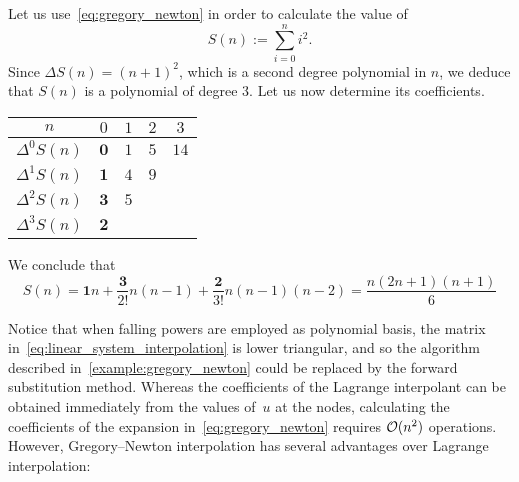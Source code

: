 \begin{example}
    \label{example:gregory_newton}
    Let us use~\eqref{eq:gregory_newton} in order to calculate the value of
    \[
        S(n) := \sum_{i=0}^{n} i^2.
    \]
    Since $\Delta S(n) = (n+1)^2$,
    which is a second degree polynomial in $n$,
    we deduce that $S(n)$ is a polynomial of degree 3.
    Let us now determine its coefficients.
    \begin{center}
    \begin{tabular}{|c|c|c|c|c|}
        \hline
        $n$    & $0$ & $1$ & $2$ & $3$ \\ \hline
        $\Delta^0 S(n)$ & $\mathbf{0}$ & $1$ & $5$ & $14$ \\ \hline
        $\Delta^1 S(n)$ & $\mathbf{1}$ & $4$ & $9$ &  \\ \hline
        $\Delta^2 S(n)$ & $\mathbf{3}$ & $5$ & & \\ \hline
        $\Delta^3 S(n)$ & $\mathbf{2}$ & & & \\ \hline
    \end{tabular}
    \end{center}
    We conclude that
    \[
        S(n) = \mathbf{1} n + \frac{\mathbf{3}}{2!} n(n-1) + \frac{\mathbf{2}}{3!} n(n-1)(n-2)
        = \frac{n (2n+1) (n+1)}{6}
    \]
\end{example}
Notice that when falling powers are employed as polynomial basis,
the matrix in~\eqref{eq:linear_system_interpolation} is lower triangular,
and so the algorithm described in~\cref{example:gregory_newton} could be replaced by the forward substitution method.
Whereas the coefficients of the Lagrange interpolant can be obtained immediately from the values of~$u$ at the nodes,
calculating the coefficients of the expansion in~\eqref{eq:gregory_newton} requires $\mathcal O(n^2)$ operations.
However, Gregory--Newton interpolation has several advantages over Lagrange interpolation:
